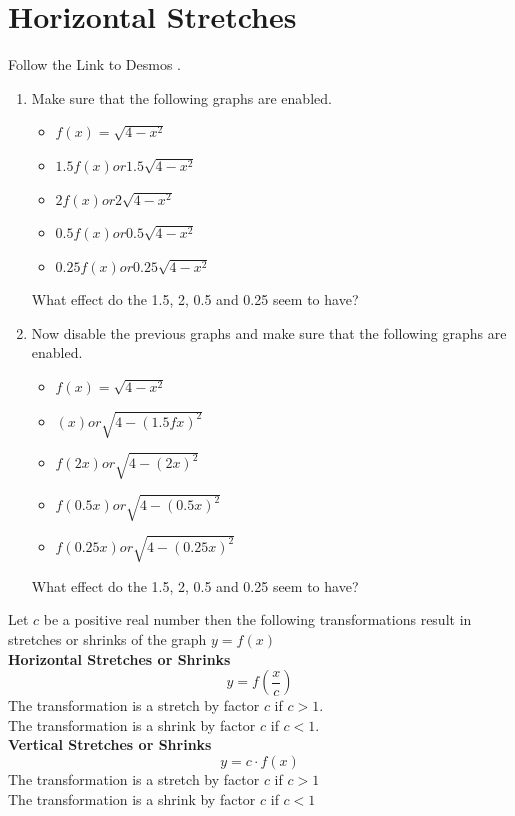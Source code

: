 \documentclass{ximera}
\begin{document}
\section{Horizontal Stretches}
\begin{exploration}
Follow the Link to Desmos . 
\begin{enumerate}
\item Make sure that the following graphs are enabled.
\begin{itemize}
\item $f(x) = \sqrt{4-x^2}$ 
\item $1.5f(x) or 1.5\sqrt{4-x^2} $
\item $2f(x) or 2\sqrt{4-x^2}$
\item $0.5f(x) or 0.5\sqrt{4-x^2}$
\item $0.25f(x) or 0.25\sqrt{4-x^2}$
\end{itemize}
What effect do the 1.5, 2, 0.5 and 0.25 seem to have?
\item Now disable the previous graphs and make sure that the following graphs are enabled.
\begin{itemize}
\item $f(x) = \sqrt{4-x^2}$ 
\item $(x) or \sqrt{4-(1.5fx)^2}$
\item $f(2x) or \sqrt{4-(2x)^2}$
\item $f(0.5x) or \sqrt{4-(0.5x)^2}$
\item $f(0.25x) or \sqrt{4-(0.25x)^2}$
\end{itemize}
What effect do the 1.5, 2, 0.5 and 0.25 seem to have?
\end{enumerate}
\end{exploration}
\begin{callout}
Let $c$ be a positive real number then the following transformations result in stretches or shrinks of the graph $y = f(x)$\\
\textbf{Horizontal Stretches or Shrinks}
\[
y=f(\frac{x}{c})
\]
The transformation is a stretch by factor $c$ if $c>1$.\\
The transformation is a shrink by factor $c$ if $c<1$.\\
\textbf{Vertical Stretches or Shrinks}
\[
y=c \cdot f(x)
\]
The transformation is a stretch by factor $c$ if $c>1$\\
The transformation is a shrink by factor $c$ if $c<1$
\end{callout}
\end{document}
